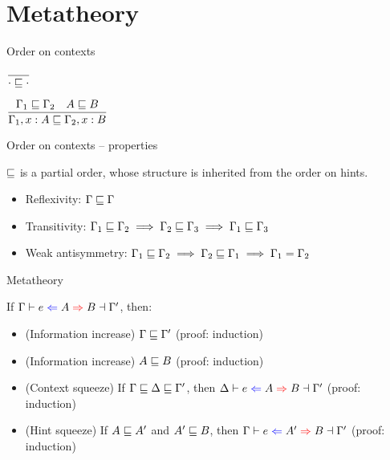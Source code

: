 \documentclass{beamer}
\begin{document}
\section{Metatheory}

\begin{frame}{Order on contexts}

\begin{center}
  $\displaystyle \frac{}{\cdot \sqsubseteq \cdot} \textsc{\footnotesize{}}$

  \vspace{2em}

  $\displaystyle \frac{\Gamma_1 \sqsubseteq \Gamma_2 \quad A \sqsubseteq B}{\Gamma_1, x : A \sqsubseteq \Gamma_2, x : B} \textsc{\footnotesize{}}$
\end{center}

\end{frame}

\begin{frame}{Order on contexts -- properties}

$\sqsubseteq$ is a partial order, whose structure is inherited from the order on hints.

\begin{itemize}
  \item Reflexivity: $\Gamma \sqsubseteq \Gamma$
  \item Transitivity: $\Gamma_1 \sqsubseteq \Gamma_2 \implies \Gamma_2 \sqsubseteq \Gamma_3 \implies \Gamma_1 \sqsubseteq \Gamma_3$
  \item Weak antisymmetry: $\Gamma_1 \sqsubseteq \Gamma_2 \implies \Gamma_2 \sqsubseteq \Gamma_1 \implies \Gamma_1 = \Gamma_2$
\end{itemize}

\end{frame}

\begin{frame}{Metatheory}

If $\fulloutctx{\Gamma}{e}{A}{B}{\Gamma'}$, then:

\begin{itemize}
  \item (Information increase) $\Gamma \sqsubseteq \Gamma'$ (proof: induction)
  \item (Information increase) $A \sqsubseteq B$ (proof: induction)
  \item (Context squeeze) If $\Gamma \sqsubseteq \Delta \sqsubseteq \Gamma'$, then $\fulloutctx{\Delta}{e}{A}{B}{\Gamma'}$ (proof: induction)
  \item (Hint squeeze) If $A \sqsubseteq A'$ and $A' \sqsubseteq B$, then $\fulloutctx{\Gamma}{e}{A'}{B}{\Gamma'}$ (proof: induction)
\end{itemize}

\end{frame}
\end{document}
